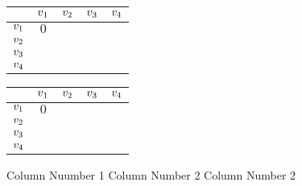 
\begin{table}[!htb]
  \begin{tabular}{c|cccc}
           & $v_1$ & $v_2$ & $v_3$ & $v_4$ \\ \hline
    $v_1$ & $0$    &        &        &        \\
    $v_2$ &        &        &        &        \\
    $v_3$ &        &        &        &        \\
    $v_4$ &        &        &        &
  \end{tabular}
\end{table}

\begin{table}[!htb]
  \begin{tabular}{c|cccc}
           & $v_1$ & $v_2$ & $v_3$ & $v_4$ \\ \hline
    $v_1$ & $0$    &        &        &        \\
    $v_2$ &        &        &        &        \\
    $v_3$ &        &        &        &        \\
    $v_4$ &        &        &        &
  \end{tabular}
\end{table}

\begin{multicols}{3}
  Column Nuumber 1
  \columnbreak
  Column Number 2
  \columnbreak
  Column Number 2
\end{multicols}